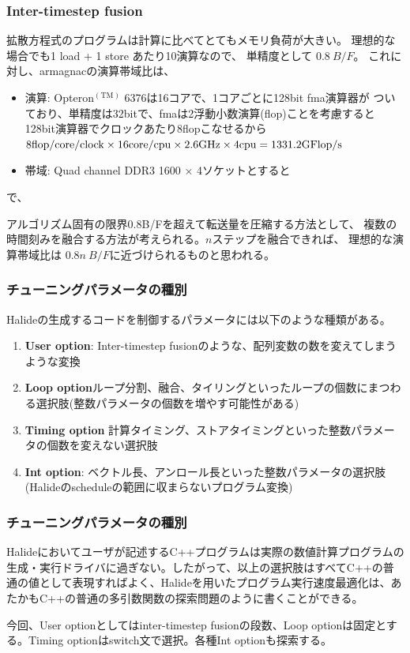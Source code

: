 \documentclass[dvipdfmx,cjk]{beamer}
\begin{document}
\begin{frame}\frametitle{Inter-timestep fusion}
  拡散方程式のプログラムは計算に比べてとてもメモリ負荷が大きい。
  理想的な場合でも1 load + 1 store あたり10演算なので、
  単精度として $0.8~B/F$。
  これに対し、armagnacの演算帯域比は、
  \begin{itemize}
  \item 演算: Opteron${}^\mathrm{(TM)}$ 6376は16コアで、1コアごとに128bit fma演算器が
    ついており、単精度は32bitで、fmaは2浮動小数演算(flop)ことを考慮すると128bit演算器でクロックあたり8flopこなせるから $\rm 8flop/core/clock \times 16 core/cpu \times 2.6GHz \times 4cpu = 1331.2GFlop/s$
  \item 帯域: Quad channel DDR3 1600 $\times$ 4ソケットとすると
  \end{itemize}
  
  で、
  
  アルゴリズム固有の限界0.8B/Fを超えて転送量を圧縮する方法として、
  複数の時間刻みを融合する方法が考えられる。$n$ステップを融合できれば、
  理想的な演算帯域比は
   $0.8n~B/F$に近づけられるものと思われる。

\end{frame}


\begin{frame}\frametitle{チューニングパラメータの種別}
  Halideの生成するコードを制御するパラメータには以下のような種類がある。
  \begin{enumerate}
  \item  {\bf User option}: Inter-timestep fusionのような、配列変数の数を変えてしまうような変換
  \item  {\bf Loop option}ループ分割、融合、タイリングといったループの個数にまつわる選択肢(整数パラメータの個数を増やす可能性がある)
  \item  {\bf Timing option} 計算タイミング、ストアタイミングといった整数パラメータの個数を変えない選択肢
  \item  {\bf Int option}: ベクトル長、アンロール長といった整数パラメータの選択肢
    (Halideのscheduleの範囲に収まらないプログラム変換)
  \end{enumerate}
\end{frame}
  
\begin{frame}\frametitle{チューニングパラメータの種別}  
  Halideにおいてユーザが記述するC++プログラムは実際の数値計算プログラムの生成・実行ドライバに過ぎない。したがって、以上の選択肢はすべてC++の普通の値として表現すればよく、Halideを用いたプログラム実行速度最適化は、あたかもC++の普通の多引数関数の探索問題のように書くことができる。

  今回、User optionとしてはinter-timestep fusionの段数、Loop optionは固定とする。Timing optionはswitch文で選択。各種Int optionも探索する。
\end{frame}
\end{document}
